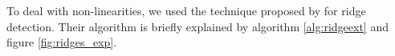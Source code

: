 \documentclass[twoside,11pt]{article}
\begin{document}
To deal with non-linearities, we used the technique proposed by \cite{1478239}
for ridge detection. Their algorithm is briefly explained by algorithm
\ref{alg:ridgeext} and figure \ref{fig:ridges_exp}.

\begin{figure}[!t]
\centering
{}


\end{figure}
\end{document}
